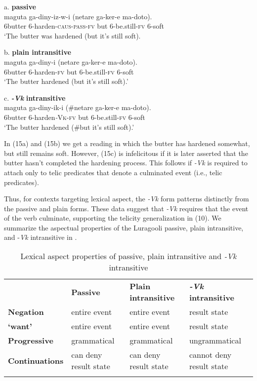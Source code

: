 \documentclass[output=paper]{langsci/langscibook}
\begin{document}
\ea
{a.\textbf{ passive}}\\
\gll maguta  ga-diny-iz-w-i                     (netare ga-ker-e       ma-doto).\\
     6butter  6-harden-\textsc{caus}{}-\textsc{pass}{}-\textsc{fv}       but      6-be.still-\textsc{fv} 6-soft\\
\glt ‘The butter was hardened (but it’s still soft).
\z

\ea
{b. \textbf{plain intransitive}}\\
\gll maguta ga-diny-i      (netare ga-ker-e       ma-doto).\\
     6butter 6-harden-\textsc{fv}   but     6-be.still-\textsc{fv}  6-soft\\
\glt ‘The butter hardened (but it’s still soft).’
\z

\ea
{c. \textbf{\textit{{}-Vk}}\textbf{ intransitive}}\\
\gll maguta ga-diny-ik-i        (\#netare ga-ker-e       ma-doto).\\
     6butter 6-harden\textit{{}-}\textsc{Vk}{}-\textsc{fv}     but      6-be.still-\textsc{fv} 6-soft\\
\glt ‘The butter hardened (\#but it’s still soft).’
\z

In (15a) and (15b) we get a reading in which the butter has hardened somewhat, but still remains soft. However, (15c) is infelicitous if it is later asserted that the butter hasn’t completed the hardening process. This follows if \textit{{}-Vk} is required to attach only to telic predicates that denote a culminated event (i.e., telic predicates).

Thus, for contexts targeting lexical aspect, the \textit{{}-Vk} form patterns distinctly from the passive and plain forms. These data suggest that \textit{{}-Vk} requires that the event of the verb culminate, supporting the telicity generalization in (10). We summarize the aspectual properties of the Luragooli passive, plain intransitive, and -\textit{Vk} intransitive in . 


\begin{table}
\caption{Lexical aspect properties of passive, plain intransitive and \textit{{}-Vk} intransitive}
\label{tab:3}

\begin{tabularx}{\textwidth}{XXXX} & \textbf{Passive} & \textbf{Plain intransitive} & \textbf{\textit{{}-Vk}}\textbf{ intransitive}\\
\lsptoprule
\textbf{Negation} & entire event & entire event & result state\\
\textbf{‘want’} & entire event & entire event & result state\\
\textbf{Progressive} & grammatical & grammatical & ungrammatical\\
\textbf{Continuations} & can deny result state & can deny result state & cannot deny result state\\
\lspbottomrule
\end{tabularx}

\end{table} 
\end{document}
